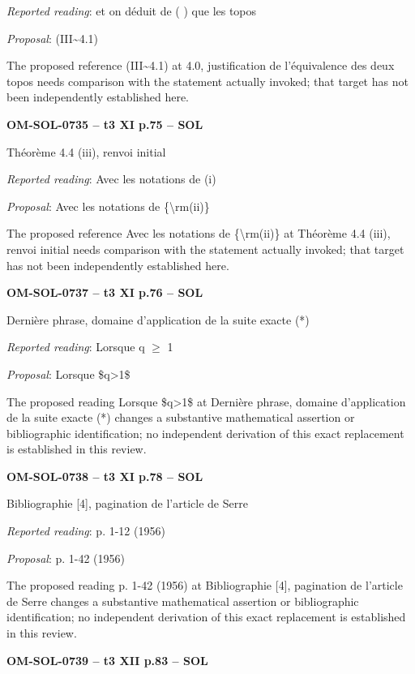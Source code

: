 \emph{Reported reading}: et on déduit de ( ) que les topos\par
\emph{Proposal}: (III\textasciitilde{}4.1)\par
The proposed reference (III\textasciitilde{}4.1) at 4.0, justification de l'équivalence des deux topos needs comparison with the statement actually invoked; that target has not been independently established here.\par
\par\noindent\textbf{OM-SOL-0735 -- t3 XI p.75 -- SOL}\par
Théorème 4.4 (iii), renvoi initial\par
\emph{Reported reading}: Avec les notations de (i)\par
\emph{Proposal}: Avec les notations de \{\textbackslash{}rm(ii)\}\par
The proposed reference Avec les notations de \{\textbackslash{}rm(ii)\} at Théorème 4.4 (iii), renvoi initial needs comparison with the statement actually invoked; that target has not been independently established here.\par
\par\noindent\textbf{OM-SOL-0737 -- t3 XI p.76 -- SOL}\par
Dernière phrase, domaine d'application de la suite exacte (*)\par
\emph{Reported reading}: Lorsque q \ensuremath{\geq} 1\par
\emph{Proposal}: Lorsque \$q>1\$\par
The proposed reading Lorsque \$q>1\$ at Dernière phrase, domaine d'application de la suite exacte (*) changes a substantive mathematical assertion or bibliographic identification; no independent derivation of this exact replacement is established in this review.\par
\par\noindent\textbf{OM-SOL-0738 -- t3 XI p.78 -- SOL}\par
Bibliographie [4], pagination de l'article de Serre\par
\emph{Reported reading}: p. 1-12 (1956)\par
\emph{Proposal}: p. 1-42 (1956)\par
The proposed reading p. 1-42 (1956) at Bibliographie [4], pagination de l'article de Serre changes a substantive mathematical assertion or bibliographic identification; no independent derivation of this exact replacement is established in this review.\par
\par\noindent\textbf{OM-SOL-0739 -- t3 XII p.83 -- SOL}\par
